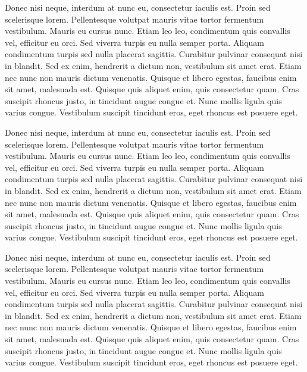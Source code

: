 \documentclass[12pt]{article}
\begin{document}
\begin{multicols}{3}
	
	Donec nisi neque, interdum at nunc eu, consectetur iaculis est. Proin sed scelerisque lorem. Pellentesque volutpat mauris vitae tortor fermentum vestibulum. Mauris eu cursus nunc. Etiam leo leo, condimentum quis convallis vel, efficitur eu orci. Sed viverra turpis eu nulla semper porta. Aliquam condimentum turpis sed nulla placerat sagittis. Curabitur pulvinar consequat nisi in blandit. Sed ex enim, hendrerit a dictum non, vestibulum sit amet erat. Etiam nec nunc non mauris dictum venenatis. Quisque et libero egestas, faucibus enim sit amet, malesuada est. Quisque quis aliquet enim, quis consectetur quam. Cras suscipit rhoncus justo, in tincidunt augue congue et. Nunc mollis ligula quis varius congue. Vestibulum suscipit tincidunt eros, eget rhoncus est posuere eget.
	
	Donec nisi neque, interdum at nunc eu, consectetur iaculis est. Proin sed scelerisque lorem. Pellentesque volutpat mauris vitae tortor fermentum vestibulum. Mauris eu cursus nunc. Etiam leo leo, condimentum quis convallis vel, efficitur eu orci. Sed viverra turpis eu nulla semper porta. Aliquam condimentum turpis sed nulla placerat sagittis. Curabitur pulvinar consequat nisi in blandit. Sed ex enim, hendrerit a dictum non, vestibulum sit amet erat. Etiam nec nunc non mauris dictum venenatis. Quisque et libero egestas, faucibus enim sit amet, malesuada est. Quisque quis aliquet enim, quis consectetur quam. Cras suscipit rhoncus justo, in tincidunt augue congue et. Nunc mollis ligula quis varius congue. Vestibulum suscipit tincidunt eros, eget rhoncus est posuere eget.
	
	Donec nisi neque, interdum at nunc eu, consectetur iaculis est. Proin sed scelerisque lorem. Pellentesque volutpat mauris vitae tortor fermentum vestibulum. Mauris eu cursus nunc. Etiam leo leo, condimentum quis convallis vel, efficitur eu orci. Sed viverra turpis eu nulla semper porta. Aliquam condimentum turpis sed nulla placerat sagittis. Curabitur pulvinar consequat nisi in blandit. Sed ex enim, hendrerit a dictum non, vestibulum sit amet erat. Etiam nec nunc non mauris dictum venenatis. Quisque et libero egestas, faucibus enim sit amet, malesuada est. Quisque quis aliquet enim, quis consectetur quam. Cras suscipit rhoncus justo, in tincidunt augue congue et. Nunc mollis ligula quis varius congue. Vestibulum suscipit tincidunt eros, eget rhoncus est posuere eget.
	
\end{multicols}
\end{document}

